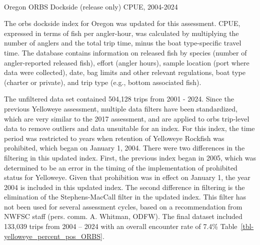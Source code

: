 \documentclass[
]{scrartcl}
\makeatletter
\let\oldparagraph\paragraph
\renewcommand{\paragraph}{
    \@ifstar
      \xxxParagraphStar
      \xxxParagraphNoStar
  }
\newcommand{\xxxParagraphStar}[1]{\oldparagraph*{#1}\mbox{}}
\newcommand{\xxxParagraphNoStar}[1]{\oldparagraph{#1}\mbox{}}
\makeatother
\begin{document}
\paragraph{Oregon ORBS Dockside (release only) CPUE,
2004-2024}\label{oregon-orbs-dockside-release-only-cpue-2004-2024}

The \gls{orbs} dockside index for Oregon was updated for this
assessment. CPUE, expressed in terms of fish per angler-hour, was
calculated by multiplying the number of anglers and the total trip time,
minus the boat type-specific travel time. The database contains
information on released fish by species (number of angler-reported
released fish), effort (angler hours), sample location (port where data
were collected), date, bag limits and other relevant regulations, boat
type (charter or private), and trip type (e.g., bottom associated fish).

The unfiltered data set contained 504,128 trips from 2001 - 2024. Since
the previous Yelloweye assessment, multiple data filters have been
standardized, which are very similar to the 2017 assessment, and are
applied to \gls{orbs} trip-level data to remove outliers and data
unsuitable for an index. For this index, the time period was restricted
to years when retention of Yelloweye Rockfish was prohibited, which
began on January 1, 2004. There were two differences in the filtering in
this updated index. First, the previous index began in 2005, which was
determined to be an error in the timing of the implementation of
prohibited status for Yelloweye. Given that prohibition was in effect on
January 1, the year 2004 is included in this updated index. The second
difference in filtering is the elimination of the Stephens-MacCall
filter in the updated index. This filter has not been used for several
assessment cycles, based on a recommendation from NWFSC staff (pers.
comm. A. Whitman, ODFW). The final dataset included 133,039 trips from
2004 -- 2024 with an overall encounter rate of 7.4\%
Table~\ref{tbl-yelloweye_percent_pos_ORBS}.
\end{document}
